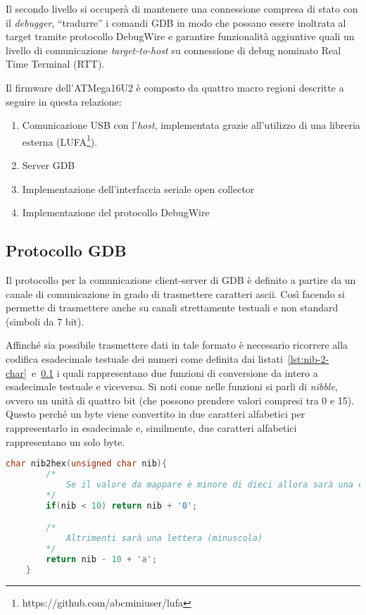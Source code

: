 Il secondo livello si occuperà di mantenere una connessione compresa di stato con il \textit{debugger}, ``tradurre'' i comandi GDB in modo che possano essere inoltrata al target tramite protocollo DebugWire e garantire funzionalità aggiuntive quali un livello di comunicazione \textit{target-to-host} su connessione di debug nominato Real Time Terminal (RTT).

Il firmware dell'ATMega16U2 è composto da quattro macro regioni descritte a seguire in questa relazione:
\begin{enumerate}
    \item Comunicazione USB con l'\textit{host}, implementata grazie all'utilizzo di una libreria esterna (LUFA\footnote{https://github.com/abcminiuser/lufa}).
    \item Server GDB
    \item Implementazione dell'interfaccia seriale open collector
    \item Implementazione del protocollo DebugWire
\end{enumerate}

\subsection{Protocollo GDB}

Il protocollo per la comunicazione client-server di GDB è definito a partire da un canale di comunicazione in grado di trasmettere caratteri ascii.
Così facendo si permette di trasmettere anche su canali strettamente testuali e non standard (simboli da 7 bit).

Affinché sia possibile trasmettere dati in tale formato è necessario ricorrere alla codifica esadecimale testuale dei numeri come definita dai listati~\ref{lst:nib-2-char}~e~\ref{} i quali rappresentano due funzioni di conversione da intero a esadecimale testuale e viceversa.
Si noti come nelle funzioni si parli di \textit{nibble}, ovvero un unità di quattro bit (che possono prendere valori compresi tra 0 e 15). Questo perché un byte viene convertito in due caratteri alfabetici per rappresentarlo in esadecimale e, similmente, due caratteri alfabetici rappresentano un solo byte.

\noindent\begin{minipage}{\textwidth}
    \begin{lstlisting}[language=C, caption={Funzione di conversione da nibble a carattere alfabetico}, label=lst:nib-2-char]
    char nib2hex(unsigned char nib){
        /*
            Se il valore da mappare è minore di dieci allora sarà una cifra
        */
        if(nib < 10) return nib + '0'; 

        /*
            Altrimenti sarà una lettera (minuscola)
        */
        return nib - 10 + 'a';
    }
    \end{lstlisting}
\end{minipage}

